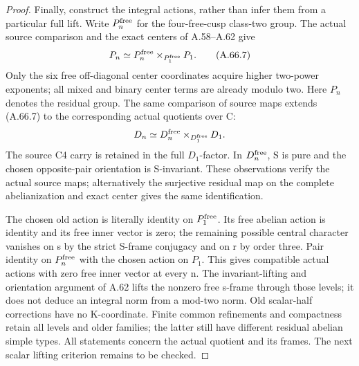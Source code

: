 \begin{proof}
Finally, construct the integral actions, rather than infer them
from a particular full lift. Write \(P_n^{\rm free}\) for the
four-free-cusp class-two group. The actual source comparison and
the exact centers of A.58--A.62 give
\[
 P_n\simeq P_n^{\rm free}
       \mathbin{\times}_{P_1^{\rm free}}P_1.
 \tag{A.66.7}
\]
Only the six free off-diagonal center coordinates acquire higher
two-power exponents; all mixed and binary center terms are
already modulo two. Here \(P_n\) denotes the residual group.
The same comparison of source maps extends (A.66.7) to the
corresponding actual quotients over C:
\[
 D_n\simeq D_n^{\rm free}
       \mathbin{\times}_{D_1^{\rm free}}D_1.
\]
The source C4 carry is retained in the full \(D_1\)-factor.
In \(D_n^{\rm free}\), S is pure and the chosen
opposite-pair orientation is S-invariant. These observations
verify the actual source maps; alternatively the surjective
residual map on the complete abelianization and exact center
gives the same identification.

The chosen old action is literally identity on
\(P_1^{\rm free}\). Its free abelian action is identity and
its free inner vector is zero; the remaining possible central
character vanishes on s by the strict S-frame conjugacy and
on r by order three. Pair identity on \(P_n^{\rm free}\)
with the chosen action on \(P_1\). This gives compatible
actual actions with zero free inner vector at every n.
The invariant-lifting and orientation argument of A.62 lifts
the nonzero free s-frame through those levels; it does not
deduce an integral norm from a mod-two norm. Old scalar-half
corrections have no K-coordinate. Finite common refinements
and compactness retain all levels and older families; the
latter still have different residual abelian simple types.
All statements concern the actual quotient and its frames. The
next scalar lifting criterion remains to be checked.
\end{proof}
